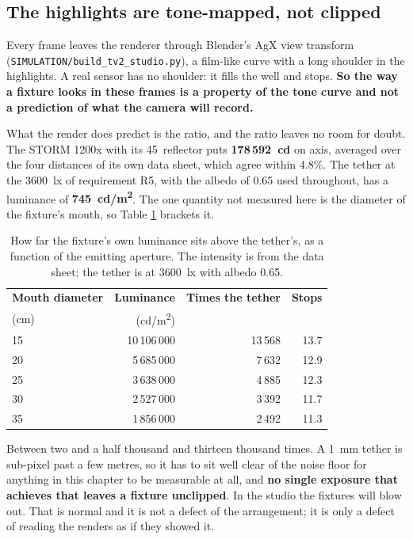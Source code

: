 \subsection{The highlights are tone-mapped, not clipped}

Every frame leaves the renderer through Blender's AgX view transform
(\texttt{SIMULATION/build\_tv2\_studio.py}), a film-like curve with a long
shoulder in the highlights. A real sensor has no shoulder: it fills the well
and stops. \textbf{So the way a fixture looks in these frames is a property
of the tone curve and not a prediction of what the camera will record.}

What the render does predict is the ratio, and the ratio leaves no room for
doubt. The STORM 1200x with its 45\textdegree\ reflector puts
\textbf{178\,592~cd} on axis, averaged over the four distances of its own
data sheet, which agree within 4.8\%. The tether at the 3600~lx of
requirement R5, with the albedo of 0.65 used throughout, has a luminance of
\textbf{745~cd/m\textsuperscript{2}}. The one quantity not measured here is
the diameter of the fixture's mouth, so Table \ref{tab:fixture-luminance}
brackets it.

\begin{table}[htbp]
\centering
\caption[Fixture against tether]{How far the fixture's own luminance sits
above the tether's, as a function of the emitting aperture. The intensity is
from the data sheet; the tether is at 3600~lx with albedo 0.65.}
\label{tab:fixture-luminance}
\begin{tabularx}{\textwidth}{@{}X r r r@{}}
\toprule
\textbf{Mouth diameter} & \textbf{Luminance} & \textbf{Times the tether} &
\textbf{Stops} \\
(cm) & (cd/m\textsuperscript{2}) & & \\
\midrule
15 & 10\,106\,000 & 13\,568 & 13.7 \\
20 & 5\,685\,000 & 7\,632 & 12.9 \\
25 & 3\,638\,000 & 4\,885 & 12.3 \\
30 & 2\,527\,000 & 3\,392 & 11.7 \\
35 & 1\,856\,000 & 2\,492 & 11.3 \\
\bottomrule
\end{tabularx}
\end{table}

Between two and a half thousand and thirteen thousand times. A 1~mm tether is
sub-pixel past a few metres, so it has to sit well clear of the noise floor
for anything in this chapter to be measurable at all, and \textbf{no single
exposure that achieves that leaves a fixture unclipped}. In the studio the
fixtures will blow out. That is normal and it is not a defect of the
arrangement; it is only a defect of reading the renders as if they showed it.

